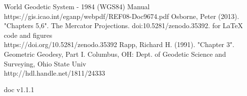 \documentclass[conference]{IEEEtran}
\begin{document}
\begin{thebibliography}{1}
  World Geodetic System - 1984 (WGS84) Manual\\
https://gis.icao.int/eganp/webpdf/REF08-Doc9674.pdf
 Osborne, Peter (2013). "Chapters 5,6". The Mercator Projections. doi:10.5281/zenodo.35392. for LaTeX code and figures \\
https://doi.org/10.5281/zenodo.35392
 Rapp, Richard H. (1991). "Chapter 3". Geometric Geodesy, Part I. Columbus, OH: Dept. of Geodetic Science and Surveying, Ohio State Univ \\
http://hdl.handle.net/1811/24333
\end{thebibliography}

\vspace*{\fill}
\hspace*{\fill} doc v1.1.1
\end{document}
